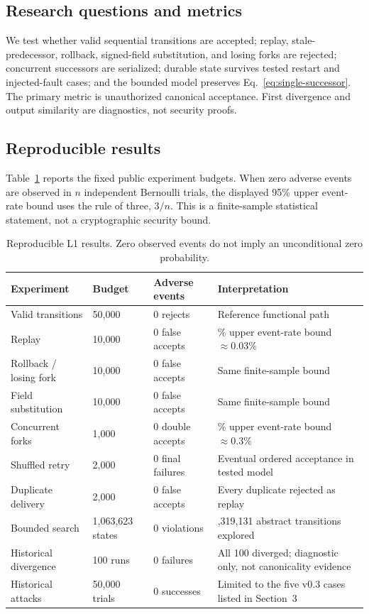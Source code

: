 \documentclass[11pt]{article}
\begin{document}
\subsection{Research questions and metrics}
We test whether valid sequential transitions are accepted; replay, stale-predecessor, rollback, signed-field substitution, and losing forks are rejected; concurrent successors are serialized; durable state survives tested restart and injected-fault cases; and the bounded model preserves Eq.~\ref{eq:single-successor}. The primary metric is unauthorized canonical acceptance. First divergence and output similarity are diagnostics, not security proofs.

\subsection{Reproducible results}
Table~\ref{tab:results} reports the fixed public experiment budgets. When zero adverse events are observed in $n$ independent Bernoulli trials, the displayed 95\% upper event-rate bound uses the rule of three, $3/n$. This is a finite-sample statistical statement, not a cryptographic security bound.

\begin{table}[t]
\centering
\caption{Reproducible L1 results. Zero observed events do not imply an unconditional zero probability.}
\label{tab:results}
\small
\begin{tabular}{>{\raggedright\arraybackslash}p{}p{}p{}>{\raggedright\arraybackslash}p{}}
\toprule
Experiment & Budget & Adverse events & Interpretation\\
\midrule
Valid transitions & 50,000 & 0 rejects & Reference functional path\\
Replay & 10,000 & 0 false accepts & 95\% upper event-rate bound $\approx0.03\%$\\
Rollback / losing fork & 10,000 & 0 false accepts & Same finite-sample bound\\
Field substitution & 10,000 & 0 false accepts & Same finite-sample bound\\
Concurrent forks & 1,000 & 0 double accepts & 95\% upper event-rate bound $\approx0.3\%$\\
Shuffled retry & 2,000 & 0 final failures & Eventual ordered acceptance in tested model\\
Duplicate delivery & 2,000 & 0 false accepts & Every duplicate rejected as replay\\
Bounded search & 1,063,623 states & 0 violations & 2,319,131 abstract transitions explored\\
Historical divergence & 100 runs & 0 failures & All 100 diverged; diagnostic only, not canonicality evidence\\
Historical attacks & 50,000 trials & 0 successes & Limited to the five v0.3 cases listed in Section~3\\
\bottomrule
\end{tabular}
\end{table}
\end{document}
